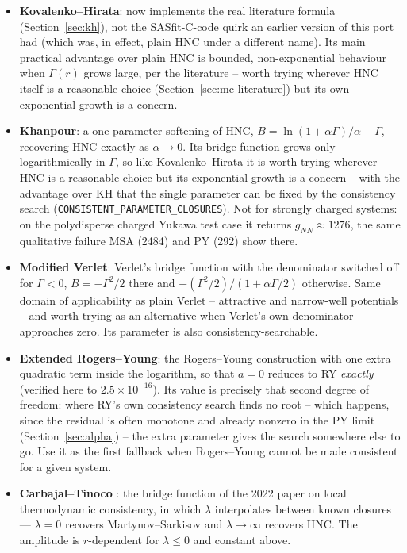 \documentclass[11pt,a4paper]{article}
\newcommand{\code}[1]{\texttt{#1}}
\begin{document}
\begin{itemize}[nosep]
  \item \textbf{Kovalenko--Hirata}: now implements the real literature
    formula (Section~\ref{sec:kh}), not the SASfit-C-code quirk an
    earlier version of this port had (which was, in effect, plain HNC
    under a different name). Its main practical advantage over plain
    HNC is bounded, non-exponential behaviour when $\Gamma(r)$ grows
    large, per the literature \cite{ebato2016} -- worth trying wherever
    HNC itself is a reasonable choice (Section~\ref{sec:mc-literature})
    but its own exponential growth is a concern.
  \item \textbf{Khanpour}: a one-parameter softening of HNC,
    $B = \ln(1+\alpha\Gamma)/\alpha - \Gamma$, recovering HNC exactly as
    $\alpha\to0$. Its bridge function grows only logarithmically in $\Gamma$,
    so like Kovalenko--Hirata it is worth trying wherever HNC is a reasonable
    choice but its exponential growth is a concern -- with the advantage over
    KH that the single parameter can be fixed by the consistency search
    (\code{CONSISTENT\_PARAMETER\_CLOSURES}). Not for strongly charged
    systems: on the polydisperse charged Yukawa test case it returns
    $g_{NN}\approx1276$, the same qualitative failure MSA (2484) and PY (292)
    show there.
  \item \textbf{Modified Verlet}: Verlet's bridge function with the
    denominator switched off for $\Gamma<0$,
    $B=-\Gamma^2/2$ there and $-(\Gamma^2/2)/(1+\alpha\Gamma/2)$ otherwise.
    Same domain of applicability as plain Verlet -- attractive and
    narrow-well potentials -- and worth trying as an alternative when
    Verlet's own denominator approaches zero. Its parameter is also
    consistency-searchable.
  \item \textbf{Extended Rogers--Young}: the Rogers--Young construction with
    one extra quadratic term inside the logarithm, so that $a=0$ reduces to
    RY \emph{exactly} (verified here to $2.5\times10^{-16}$). Its value is
    precisely that second degree of freedom: where RY's own consistency
    search finds no root -- which happens, since the residual is often
    monotone and already nonzero in the PY limit
    (Section~\ref{sec:alpha}) -- the extra parameter gives the search
    somewhere else to go. Use it as the first fallback when Rogers--Young
    cannot be made consistent for a given system.
  \item \textbf{Carbajal--Tinoco} \cite{CarbajalTinoco2022}: the bridge
    function of the 2022 paper on local thermodynamic consistency, in which
    $\lambda$ interpolates between known closures --- $\lambda=0$ recovers
    Martynov--Sarkisov and $\lambda\to\infty$ recovers HNC. The amplitude is
    $r$-dependent for $\lambda\le0$ and constant above.


\end{itemize}
\end{document}
